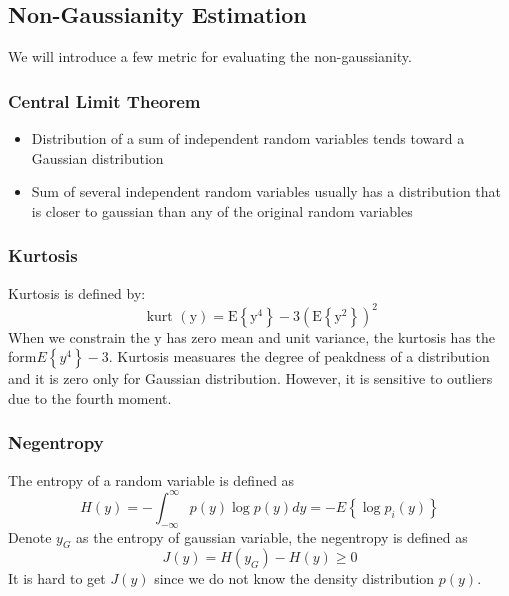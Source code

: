 \documentclass{article}
\begin{document}
\subsection{Non-Gaussianity Estimation}
We will introduce a few metric for evaluating the non-gaussianity.
\subsubsection{Central Limit Theorem}
\begin{itemize}
\item Distribution of a sum of independent random variables tends toward a Gaussian distribution
\item Sum of several independent random variables usually has a distribution that is closer to gaussian than any of the original random variables
\end{itemize}
\subsubsection{Kurtosis}
Kurtosis is defined by:
\begin{equation}
\text { kurt }(\mathrm{y})=\mathrm{E}\left\{\mathrm{y}^{4}\right\}-3\left(\mathrm{E}\left\{\mathrm{y}^{2}\right\}\right)^{2}
\end{equation}
When we constrain the $\mathrm{y}$ has zero mean and unit variance, the kurtosis has the form$
E\left\{y^{4}\right\}-3
$.
Kurtosis measuares the degree of peakdness of a distribution and it is zero only for Gaussian distribution. However, it is sensitive to outliers due to the fourth moment.

\subsubsection{Negentropy}
The entropy of a random variable is defined as
\begin{equation}
H(y)=-\int_{-\infty}^{\infty} p(y) \log p(y) d y=-E\left\{\log p_{i}(y)\right\}
\end{equation}
Denote $y_{G}$ as the entropy of gaussian variable, the negentropy is defined as
$$
J(y)=H\left(y_{G}\right)-H(y) \geq 0
$$
It is hard to get $J(y)$ since we do not know the density distribution $p(y)$.
\end{document}
